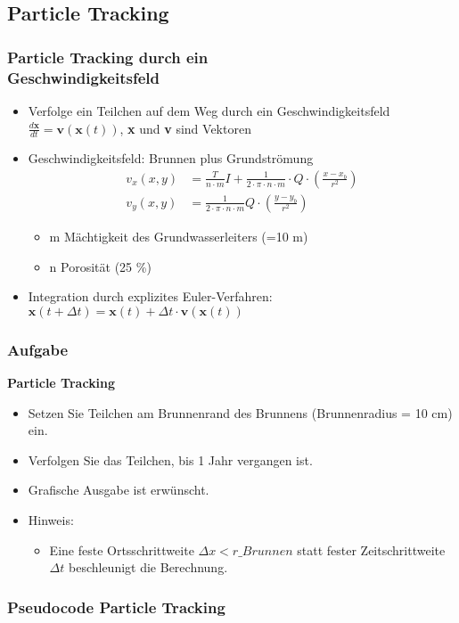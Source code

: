 \subsection{Particle Tracking}
  	\begin{frame}
		\frametitle{Particle Tracking durch ein \\Geschwindigkeitsfeld}
		\begin{itemize}
			   \item Verfolge ein Teilchen auf dem Weg durch ein Geschwindigkeitsfeld $\frac{d\textbf{x}}{dt}=\textbf{v}\left(\textbf{x}\left(t \right) \right)$, \textbf{x} und \textbf{v} sind Vektoren          
               \item Geschwindigkeitsfeld: Brunnen plus Grundströmung
                 \begin{align*}
                     v_{x}(x,y) &= \frac{T}{n \cdot m}I+\frac{1}{2 \cdot \pi \cdot n \cdot m}\cdot Q \cdot \left( \frac{x-x_{b}}{r^{2}} \right) \\
         		     v_{y}(x,y) &= \frac{1}{2 \cdot \pi \cdot n \cdot m}Q \cdot \left( \frac{y-y_{b}}{r^{2}} \right)
         		 \end{align*}
          
                  \begin{itemize}
					\item m	Mächtigkeit des Grundwasserleiters (=10 m)
					\item n	Porosität (25 \%)
				  \end{itemize}
				 \item Integration durch explizites Euler-Verfahren: $\textbf{x} \left(t+\Delta t \right)=\textbf{x}(t)+\Delta t \cdot \textbf{v}(\textbf{x}(t))$

		\end{itemize}
   	\end{frame}

 \begin{frame}
		\frametitle{Aufgabe}
          \begin{exercise}
              \sloppy          
              \textbf{Particle Tracking}
              \begin{itemize}
                \item Setzen Sie Teilchen am Brunnenrand des Brunnens (Brunnenradius = 10 cm) ein.
				\item Verfolgen Sie das Teilchen, bis 1 Jahr vergangen ist.
				\item Grafische Ausgabe ist erwünscht.
				\item Hinweis:
				\begin{itemize}
					\item Eine feste Ortsschrittweite $\Delta x < r\_Brunnen$ statt fester Zeitschrittweite $\Delta t$ beschleunigt die Berechnung.

				\end{itemize}
              \end{itemize}
          \end{exercise}
      \end{frame}
      
      \begin{frame}
		\frametitle{Pseudocode Particle Tracking}
		\begin{itemize}
          

		\end{itemize}
			
   	\end{frame}


